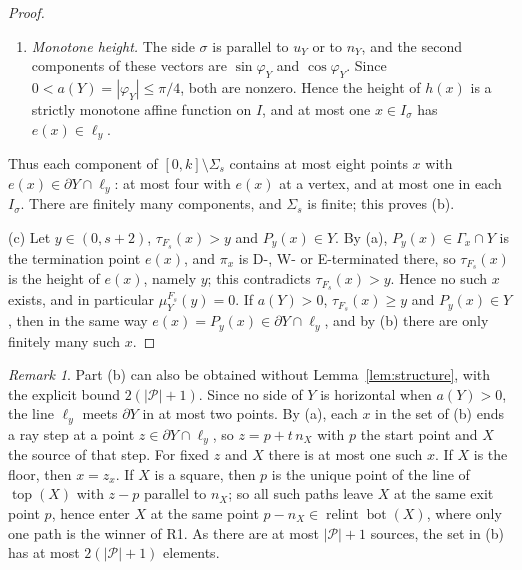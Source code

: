 \documentclass[11pt]{amsart}
\newcommand{\cP}{\mathcal P}
\newcommand{\relint}{\operatorname{relint}}
\newcommand{\Bot}{\operatorname{bot}}
\newcommand{\Top}{\operatorname{top}}
\newcommand{\Fs}{F_{s}}
\theoremstyle{definition}
\theoremstyle{remark}
\newtheorem{remark}[theorem]{Remark}
\numberwithin{equation}{section}
\begin{document}
\begin{proof}
\begin{enumerate}[label=(\arabic*)]
\item \emph{Monotone height.} The side $\sigma$ is parallel to $u_Y$ or to $n_Y$, and the second components of these vectors are $\sin\varphi_Y$ and $\cos\varphi_Y$. Since $0<a(Y)=|\varphi_Y|\le\pi/4$, both are nonzero. Hence the height of $h(x)$ is a strictly monotone affine function on $I$, and at most one $x\in I_\sigma$ has $e(x)\in\ell_y$.
\end{enumerate}
Thus each component of $[0,k]\setminus\Sigma_s$ contains at most eight points $x$ with $e(x)\in\partial Y\cap\ell_y$: at most four with $e(x)$ at a vertex, and at most one in each $I_\sigma$. There are finitely many components, and $\Sigma_s$ is finite; this proves (b).

(c) Let $y\in(0,s+2)$, $\tau_{\Fs}(x)>y$ and $P_y(x)\in Y$. By (a), $P_y(x)\in\Gamma_x\cap Y$ is the termination point $e(x)$, and $\pi_x$ is D-, W- or E-terminated there, so $\tau_{\Fs}(x)$ is the height of $e(x)$, namely $y$; this contradicts $\tau_{\Fs}(x)>y$. Hence no such $x$ exists, and in particular $\mu^{\Fs}_Y(y)=0$. If $a(Y)>0$, $\tau_{\Fs}(x)\ge y$ and $P_y(x)\in Y$, then in the same way $e(x)=P_y(x)\in\partial Y\cap\ell_y$, and by (b) there are only finitely many such $x$.
\end{proof}

\begin{remark}\label{rem:P7-count}
Part (b) can also be obtained without Lemma~\ref{lem:structure}, with the explicit bound $2(|\cP|+1)$. Since no side of $Y$ is horizontal when $a(Y)>0$, the line $\ell_y$ meets $\partial Y$ in at most two points. By (a), each $x$ in the set of (b) ends a ray step at a point $z\in\partial Y\cap\ell_y$, so $z=p+t\,n_X$ with $p$ the start point and $X$ the source of that step. For fixed $z$ and $X$ there is at most one such $x$. If $X$ is the floor, then $x=z_x$. If $X$ is a square, then $p$ is the unique point of the line of $\Top(X)$ with $z-p$ parallel to $n_X$; so all such paths leave $X$ at the same exit point $p$, hence enter $X$ at the same point $p-n_X\in\relint\Bot(X)$, where only one path is the winner of R1. As there are at most $|\cP|+1$ sources, the set in (b) has at most $2(|\cP|+1)$ elements.
\end{remark}
\end{document}
